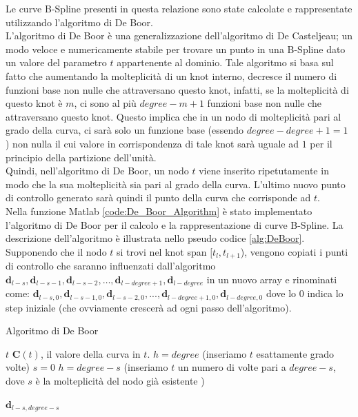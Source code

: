 \documentclass[a4paper, 12pt]{article}
\begin{document}
Le curve B-Spline presenti in questa relazione sono state calcolate e rappresentate  utilizzando l'algoritmo di De Boor.\\ 
L'algoritmo di De Boor è una generalizzazione dell'algoritmo di De Casteljeau; un modo veloce e numericamente stabile per trovare un punto in una B-Spline dato un valore del parametro $t$ appartenente al dominio. Tale algoritmo si basa sul fatto che aumentando la molteplicità di un knot interno, decresce il numero di funzioni base non nulle che attraversano questo knot, infatti, se la molteplicità di questo knot è $m$, ci sono al più $degree-m+1$ funzioni base non nulle che attraversano questo knot. Questo implica che in un nodo di molteplicità pari al grado della curva, ci sarà solo un funzione base (essendo $degree-degree+1=1$ ) non nulla il cui valore in corrispondenza di tale knot sarà uguale ad $1$ per il principio della partizione dell'unità.\\
Quindi, nell'algoritmo di De Boor, un nodo $t$ viene inserito ripetutamente in modo che la sua molteplicità sia pari al grado della curva. L'ultimo nuovo punto di controllo generato sarà quindi il punto della curva che corrisponde ad $t$.\\
Nella funzione Matlab  \ref{code:De_Boor_Algorithm} è stato implementato l'algoritmo di De Boor per il calcolo e la rappresentazione di curve B-Spline. La descrizione dell'algoritmo è illustrata nello pseudo codice \ref{alg:DeBoor}. Supponendo che il nodo $t$ si trovi nel knot span $[t_l, t_{l+1}$), vengono copiati i punti di controllo che saranno influenzati dall'algoritmo $\mathbf{d}_{l-s}, \mathbf{d}_{l-s-1}, \mathbf{d}_{l-s-2}, \dots , \mathbf{d}_{l-degree+1}, \mathbf{d}_{l-degree}$ in un nuovo array e rinominati come: $\mathbf{d}_{l-s,0} , \mathbf{d}_{l-s-1,0} , \mathbf{d}_{l-s-2,0} , ... , \mathbf{d}_{l-degree+1,0} , \mathbf{d}_{l-degree,0}$ dove lo 0 indica lo step iniziale (che ovviamente crescerà ad ogni passo dell'algoritmo).

\begin{algorithm}
	\caption{Algoritmo di De Boor}
	\label{alg:DeBoor}
	\begin{algorithmic} 
		\REQUIRE $t$
		\ENSURE $\mathbf{C}(t)$, il valore della curva in $t$.
		\STATE $h = degree$ (inseriamo $t$ esattamente grado volte)
		\STATE $s = 0$
		\ELSE
		\STATE $h = degree - s$ (inseriamo $t$ un numero di volte pari a $degree - s$, dove $s$ è la molteplicità del nodo già esistente  )
		\ENDIF
		
		\ENDFOR
		\RETURN $\mathbf{d}_{l-s,degree-s}$
	\end{algorithmic}
\end{algorithm}
\end{document}
